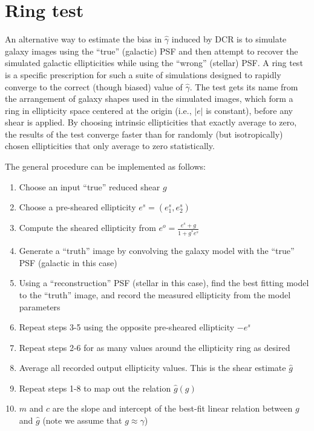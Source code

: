 \documentclass[apj]{emulateapj}
\begin{document}
\section{Ring test}\label{sec:ringtest}
An alternative way to estimate the bias in $\hat{\gamma}$ induced by
DCR is to simulate galaxy images using the ``true'' (galactic) PSF and
then attempt to recover the simulated galactic ellipticities while
using the ``wrong'' (stellar) PSF.  A ring test \citep{Nakajima2007}
is a specific prescription for such a suite of simulations designed to
rapidly converge to the correct (though biased) value of
$\hat{\gamma}$.  The test gets its name from the arrangement of galaxy
shapes used in the simulated images, which form a ring in ellipticity
space centered at the origin (i.e., $|e|$ is constant), before any
shear is applied.  By choosing intrinsic ellipticities that exactly
average to zero, the results of the test converge faster than for
randomly (but isotropically) chosen ellipticities that only average to
zero statistically.

The general procedure can be implemented as follows:

\begin{enumerate}
  \item Choose an input ``true'' reduced shear $g$
  \item Choose a pre-sheared ellipticity $e^s = (e_1^s, e_2^s)$
  \item Compute the sheared ellipticity from $e^o = \frac{e^s+g}{1+g^*e^s}$
  \item Generate a ``truth'' image by convolving the galaxy model with
    the ``true'' PSF (galactic in this case)
  \item Using a ``reconstruction'' PSF (stellar in this case), find
    the best fitting model to the ``truth'' image, and record the
    measured ellipticity from the model parameters
  \item Repeat steps 3-5 using the opposite pre-sheared ellipticity
    $-e^s$
  \item Repeat steps 2-6 for as many values around the ellipticity
    ring as desired
  \item Average all recorded output ellipticity values.  This is the
    shear estimate $\hat{g}$
  \item Repeat steps 1-8 to map out the relation $\hat{g}(g)$
  \item $m$ and $c$ are the slope and intercept of the best-fit linear
    relation between $g$ and $\hat{g}$ (note we assume that $g \approx
    \gamma$)
\end{enumerate}
\end{document}
